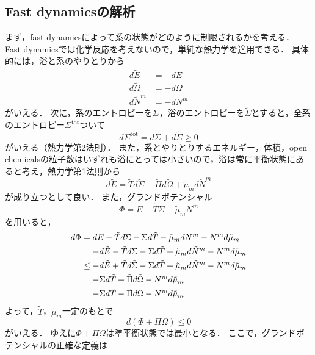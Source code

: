 \documentclass[a4paper,11pt]{jsarticle}
\theoremstyle{definition}
\begin{document}
\subsection{Fast dynamicsの解析}
まず，fast dynamicsによって系の状態がどのように制限されるかを考える．
Fast dynamicsでは化学反応を考えないので，単純な熱力学を適用できる．
具体的には，浴と系のやりとりから
\begin{align}
  d\tilde{E} &= - dE \\
  d\tilde{\Omega} &= - d\Omega \\
  d\tilde{N}^m &= - dN^m  
\end{align}
がいえる．
次に，系のエントロピーを$\Sigma$，浴のエントロピーを$\tilde{\Sigma}$とすると，全系のエントロピー$\Sigma^{\mathrm{tot}}$ついて
\begin{equation}
  d\Sigma^{\mathrm{tot}} =  d\Sigma + d\tilde{\Sigma} \ge 0
\end{equation}
がいえる（熱力学第2法則）．
また，系とやりとりするエネルギー，体積，open chemicalsの粒子数はいずれも浴にとっては小さいので，浴は常に平衡状態にあると考え，熱力学第1法則から
\begin{equation}
  d\tilde{E} = \tilde{T}d\tilde{\Sigma} - \tilde{\Pi}d\tilde{\Omega} + \tilde{\mu}_m d\tilde{N}^m
\end{equation}
が成り立つとして良い．
また，グランドポテンシャル
\begin{equation}
  \Phi = E - \tilde{T} \Sigma - \tilde{\mu}_m N^m
\end{equation}
を用いると，
\begin{align}
  d\Phi &= dE - \tilde{T} d\Sigma - \Sigma d\tilde{T} - \tilde{\mu}_m dN^m - N^m d\tilde{\mu}_m \notag\\
  &= -d\tilde{E} - \tilde{T} d\Sigma - \Sigma d\tilde{T} + \tilde{\mu}_m d\tilde{N}^m - N^m d\tilde{\mu}_m \notag\\
  &\le -d\tilde{E} + \tilde{T} d\tilde{\Sigma} - \Sigma d\tilde{T} + \tilde{\mu}_m d\tilde{N}^m - N^m d\tilde{\mu}_m \notag\\
  &= - \Sigma d\tilde{T} + \tilde{\Pi}d\tilde{\Omega} - N^m d\tilde{\mu}_m \notag\\
  &=   - \Sigma d\tilde{T} - \tilde{\Pi}d\Omega - N^m d\tilde{\mu}_m \label{grand}
\end{align}
よって，$\tilde{T}$，$\tilde{\mu}_m$一定のもとで
\begin{equation}
  d\left(\Phi + \Pi \Omega \right) \le 0
\end{equation}
がいえる．
ゆえに$\Phi + \Pi \Omega$は準平衡状態では最小となる．
ここで，グランドポテンシャルの正確な定義は
\end{document}
